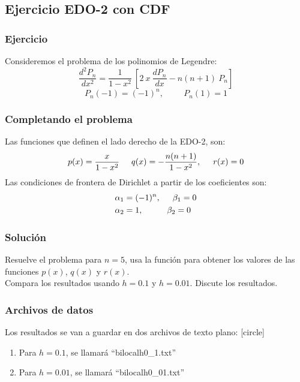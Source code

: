 \subsection{Ejercicio EDO-2 con CDF}
\begin{frame}
\frametitle{Ejercicio}
Consideremos el problema de los polinomios de Legendre:
\begin{equation}
\dfrac{d^{2} P_{n}}{d x^{2}} = \dfrac{1}{1 - x^{2}} \: \left[ 2 \: x \: \dfrac{d P_{n}}  {d x} - n (n + 1) \: P_{n} \right]
\label{eq:ecuacion_12_105}
\end{equation}
\begin{equation}
P_{n}(-1) = (-1)^{n}, \hspace{1cm} P_{n}(1) = 1
\label{eq:ecuacion_12_106}
\end{equation}
\end{frame}
\begin{frame}
\frametitle{Completando el problema}
Las funciones que definen el lado derecho de la EDO-2, son:
\begin{equation}
p(x) = \dfrac{x}{1 - x^{2}} \hspace{0.5cm} q(x) = - \dfrac{n (n + 1)}{1 - x^{2}}, \hspace{0.5cm} r(x) = 0
\label{eq:ecuacion_12_107}
\end{equation}
Las condiciones de frontera de Dirichlet a partir de los coeficientes son:
\begin{align}
\begin{aligned}
\alpha_{1} &= (-1)^{n}, \hspace{0.5cm} \beta_{1} = 0 \\
\alpha_{2} &= 1, \hspace{1cm} \beta_{2} = 0
\end{aligned}
\label{eq:ecuacion_12_108}
\end{align}
\end{frame}
\begin{frame}
\frametitle{Solución}
Resuelve el problema para $n = 5$, usa la función  para obtener los valores de las funciones $p(x)$, $q(x)$ y $r(x)$.
\\
\bigskip
Compara los resultados usando $h = 0.1$ y $h = 0.01$. Discute los resultados.
\end{frame}
\begin{frame}[fragile]
\frametitle{Archivos de datos}
Los resultados se van a guardar en dos archivos de texto plano:
[circle]
\begin{enumerate}[<+->]
\item Para $h=0.1$, se llamará \enquote{bilocalh0\_1.txt}
\item Para $h=0.01$, se llamará \enquote{bilocalh0\_01.txt}
\end{enumerate}
\end{frame}
